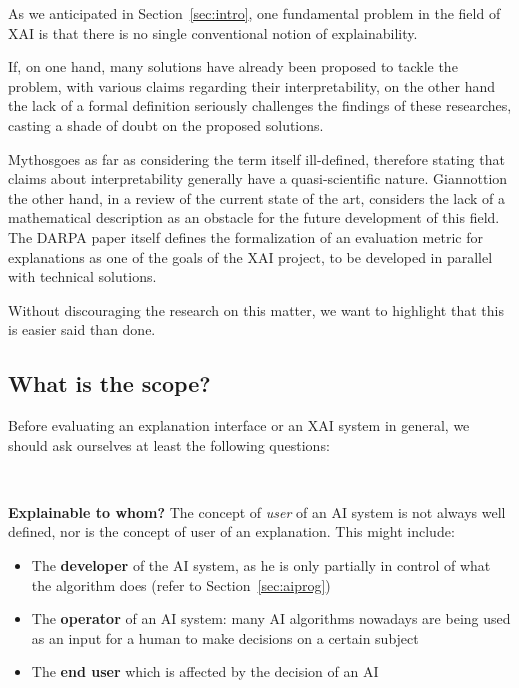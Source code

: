 \documentclass[conference]{IEEEtran}
\newcommand{\cit}[1][]{\todo[tickmarkheight=0.2cm]{cit #1}}
\begin{document}
As we anticipated in Section~\ref{sec:intro}, one fundamental problem in
the field of XAI is that there is no single conventional notion of
explainability.

If, on one hand, many solutions have already been proposed to tackle the
problem, with various claims regarding their interpretability, on the other hand
the lack of a formal definition seriously challenges the findings of these
researches, casting a shade of doubt on the proposed solutions.

Mythos\cit goes as far as considering the term itself ill-defined, therefore
stating that claims about interpretability generally have a quasi-scientific
nature. Giannotti\cit on the other hand, in a review of the current state of the
art, considers the lack of a mathematical description as an obstacle for the
future development of this field. The DARPA paper \cit itself defines the
formalization of an evaluation metric for explanations as one of the goals of
the XAI project, to be developed in parallel with technical solutions.

Without discouraging the research on this matter, we want to highlight that this
is easier said than done.

\subsection{What is the scope?}

Before evaluating an explanation interface or an XAI system in general, we
should ask ourselves at least the following questions:

\

\textbf{Explainable to whom?} The concept of \textit{user} of an AI system is
not always well defined, nor is the concept of user of an explanation. This
might include:

\begin{itemize}
    \item The \textbf{developer} of the AI system, as he is only partially in
          control of what the algorithm does (refer to Section~\ref{sec:aiprog})
    \item The \textbf{operator} of an AI system: many AI algorithms nowadays are
          being used as an input for a human to make decisions on a certain
          subject
    \item The \textbf{end user} which is affected by the decision of an AI
\end{itemize}

\
\end{document}
